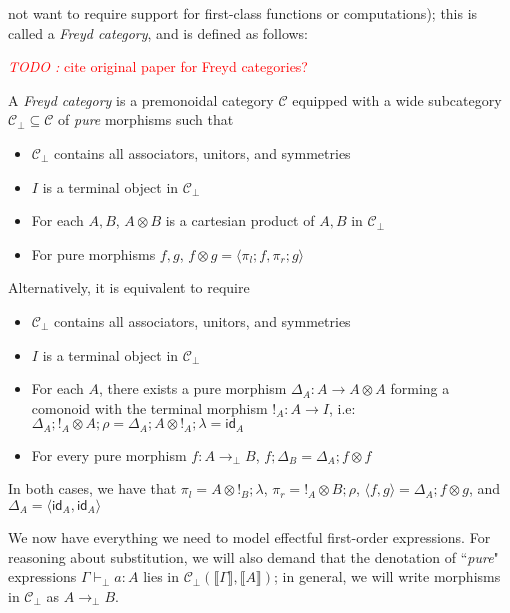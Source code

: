\documentclass[acmsmall,screen,review]{acmart}
\newcounter{todos}
\newcommand{\TODO}[1]{{
  \stepcounter{todos}
  \begin{center}\large{\textcolor{red}{\emph{TODO \arabic{todos}:} #1}}\end{center}
}}
\newcommand{\mc}[1]{\ensuremath{\mathcal{#1}}}
\newcommand{\ms}[1]{\ensuremath{\mathsf{#1}}}
\newcommand{\hasty}[4]{#1 \vdash_{#2} #3: {#4}}
\newcommand{\dnt}[1]{\llbracket{#1}\rrbracket}
\newcommand{\tmor}[1]{{!}_{#1}}
\newcommand{\dmor}[1]{{\Delta}_{#1}}
\begin{document}
not want to require support for first-class functions or computations); this is called a \emph{Freyd
category}, and is defined as follows: \TODO{cite original paper for Freyd categories?}
\begin{definition}
  A \emph{Freyd category} is a premonoidal category $\mc{C}$ equipped with a wide subcategory
  $\mc{C}_\bot \subseteq \mc{C}$ of \emph{pure} morphisms such that
  \begin{itemize}
    \item $\mc{C}_\bot$ contains all associators, unitors, and symmetries
    \item $I$ is a terminal object in $\mc{C}_\bot$
    \item For each $A, B$, $A \otimes B$ is a cartesian product of $A, B$ in $\mc{C}_\bot$
    \item For pure morphisms $f, g$, $f \otimes g = \langle \pi_l; f, \pi_r ; g  \rangle$
  \end{itemize}
  Alternatively, it is equivalent to require
  \begin{itemize}
    \item $\mc{C}_\bot$ contains all associators, unitors, and symmetries
    \item $I$ is a terminal object in $\mc{C}_\bot$
    \item For each $A$, there exists a pure morphism $\dmor{A} : A \to A \otimes A$ forming a
          comonoid with the terminal morphism $\tmor{A} : A \to I$, i.e: $\dmor{A} ; \tmor{A}
          \otimes A ; \rho = \dmor{A} ; A \otimes \tmor {A} ; \lambda = \ms{id}_A$
    \item For every pure morphism $f : A \to_\bot B$, $f ; \dmor{B} = \dmor{A} ; f \otimes f$
  \end{itemize}
  In both cases, we have that $\pi_l = A \otimes \tmor{B} ; \lambda$, $\pi_r = \tmor{A}
  \otimes B ; \rho$, $\langle f, g \rangle = \dmor{A} ; f \otimes g$, and $\dmor{A} = \langle
  \ms{id}_A, \ms{id}_A \rangle$
\end{definition}
We now have everything we need to model effectful first-order expressions. For reasoning about
substitution, we will also demand that the denotation of ``\emph{pure}" expressions
$\hasty{\Gamma}{\bot}{a}{A}$ lies in $\mc{C}_\bot(\dnt{\Gamma}, \dnt{A})$; in general, we will write
morphisms in $\mc{C}_\bot$ as $A \to_\bot B$.
\end{document}
